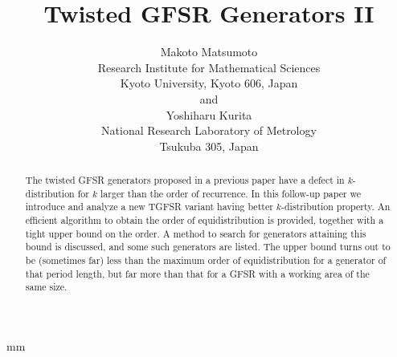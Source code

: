 
\textheight 245mm
\textwidth 172mm
 mm
\topmargin -25mm

\title{Twisted GFSR Generators II
}

\author{Makoto Matsumoto
	\\ Research Institute for Mathematical Sciences
	\\ Kyoto University, Kyoto 606, Japan
	\\ and
	\\ Yoshiharu Kurita
	\\ National Research Laboratory of Metrology
	\\ Tsukuba 305, Japan}    %

\def\thefootnote{\fnsymbol{footnote}}
\def\bx{{\bf x}}
\def\by{{\bf y}}
\def\bz{{\bf z}}
\def\bu{{\bf u}}

\def\bi{{\bf i}}
\def\ba{{\bf a}}
\def\bb{{\bf b}}
\def\bc{{\bf c}}
\def\bd{{\bf d}}
\def\be{{\bf e}}
\def\bp{{\bf p}}
\def\calx{{\cal X}}
\def\mod{{\mbox{ mod }}}
\def\appro{\mbox{trunc}}

\def\notdivide{{\hspace{1.5pt}| \hspace{-4.65pt} /}}  %

\maketitle                 %
\def\N{{\rm I\kern-0.2em N}}  %
\def\rmI{{\rm I}}

\begin{abstract}
The twisted GFSR generators proposed in a previous paper
have a defect in $k$-distribution for $k$ larger than
the order of recurrence.
In this follow-up paper
we introduce and analyze a new TGFSR variant
having better $k$-distribution property.
An efficient algorithm to obtain
the order of equidistribution is provided,
together with a tight upper bound on the order.
A method to search for generators attaining this bound
is discussed, and some such generators are listed.
The upper bound turns out to be (sometimes far) 
less than the maximum order of equidistribution
for a generator of that period length,
but far more than that for a GFSR with a working area of 
the same size.

\end{abstract}


